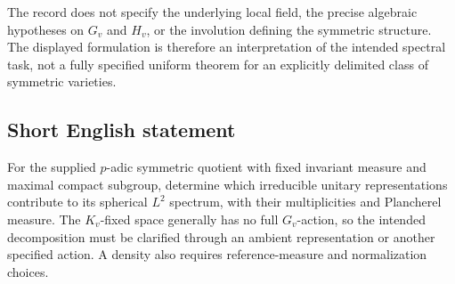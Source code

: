 \documentclass[11pt]{article}
\begin{document}
The record does not specify the underlying local field, the precise algebraic hypotheses on \(G_v\) and \(H_v\), or the involution defining the symmetric structure. The displayed formulation is therefore an interpretation of the intended spectral task, not a fully specified uniform theorem for an explicitly delimited class of symmetric varieties.
\subsection{Short English statement}
For the supplied \(p\)-adic symmetric quotient with fixed invariant measure and maximal compact subgroup, determine which irreducible unitary representations contribute to its spherical \(L^2\) spectrum, with their multiplicities and Plancherel measure. The \(K_v\)-fixed space generally has no full \(G_v\)-action, so the intended decomposition must be clarified through an ambient representation or another specified action. A density also requires reference-measure and normalization choices.
\end{document}
